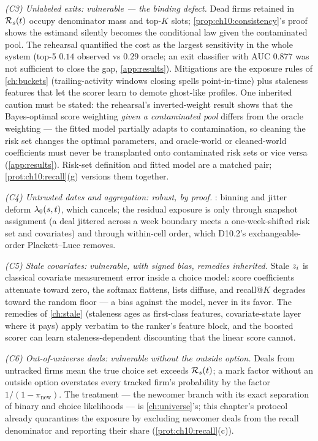 \emph{(C3) Unlabeled exits: vulnerable --- the binding defect.} Dead
firms retained in $\mathcal{R}_s(t)$ occupy denominator mass and top-$K$
slots; \cref{prop:ch10:consistency}'s proof shows the estimand silently
becomes the conditional law given the contaminated pool. The rehearsal
quantified the cost as the largest sensitivity in the whole system
(top-5 $0.14$ observed vs $0.29$ oracle; an exit classifier with AUC
$0.877$ was not sufficient to close the gap, \cref{app:results}).
Mitigations are the exposure rules of \cref{ch:buckets}
(trailing-activity windows closing spells point-in-time) plus staleness
features that let the scorer learn to demote ghost-like profiles. One
inherited caution must be stated: the rehearsal's inverted-weight result
shows that the Bayes-optimal score weighting \emph{given a contaminated
pool} differs from the oracle weighting --- the fitted model partially
adapts to contamination, so cleaning the risk set changes the optimal
parameters, and oracle-world or cleaned-world coefficients must never be
transplanted onto contaminated risk sets or vice versa
(\cref{app:results}). Risk-set definition and fitted model are a matched
pair; \cref{prot:ch10:recall}(g) versions them together.

\emph{(C4) Untrusted dates and aggregation: robust, by proof.}
: binning and jitter deform $\lambda_0(s,t)$, which
cancels; the residual exposure is only through snapshot assignment
(a deal jittered across a week boundary meets a one-week-shifted risk set
and covariates) and through within-cell order, which D10.2's
exchangeable-order Plackett--Luce removes.

\emph{(C5) Stale covariates: vulnerable, with signed bias, remedies
inherited.} Stale $z_i$ is classical covariate measurement error
inside a choice model: score coefficients attenuate toward zero, the
softmax flattens, lists diffuse, and recall@$K$ degrades toward the
random floor --- a bias against the model, never in its favor. The
remedies of \cref{ch:stale} (staleness ages as first-class features,
covariate-state layer where it pays) apply verbatim to the ranker's
feature block, and the boosted scorer can learn staleness-dependent
discounting that the linear score cannot.

\emph{(C6) Out-of-universe deals: vulnerable without the outside option.}
Deals from untracked firms mean the true choice set exceeds
$\mathcal{R}_s(t)$; a mark factor without an outside option overstates every
tracked firm's probability by the factor $1/(1 - \pi_{\mathrm{new}})$.
The treatment --- the newcomer branch with its exact separation of binary
and choice likelihoods --- is \cref{ch:universe}'s; this chapter's
protocol already quarantines the exposure by excluding newcomer deals
from the recall denominator and reporting their share
(\cref{prot:ch10:recall}(c)).

